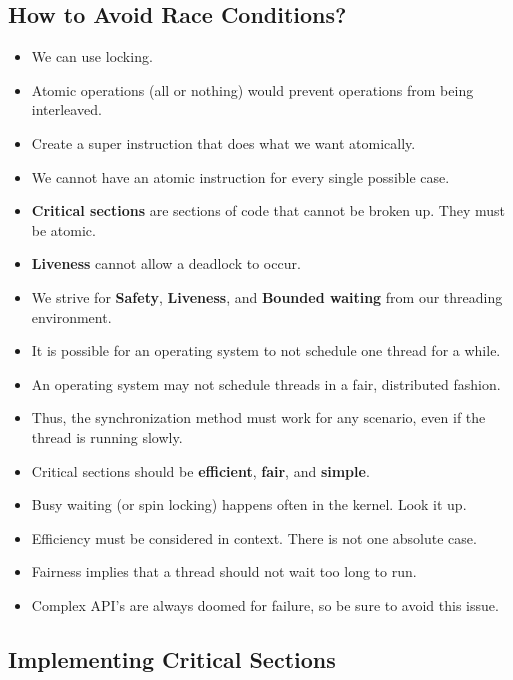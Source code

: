 \documentclass[]{article}
\begin{document}
\subsection{How to Avoid Race Conditions?}
\begin{itemize}
\item We can use locking.
\item Atomic operations (all or nothing) would prevent operations from being
interleaved.
\item Create a super instruction that does what we want atomically.
\item We cannot have an atomic instruction for every single possible case.
\item \textbf{Critical sections} are sections of code that cannot be broken up.
They must be atomic.
\item \textbf{Liveness} cannot allow a deadlock to occur.
\item We strive for \textbf{Safety}, \textbf{Liveness}, and \textbf{Bounded
waiting} from our threading environment.
\item It is possible for an operating system to not schedule one thread for a
while.
\item An operating system may not schedule threads in a fair, distributed
fashion.
\item Thus, the synchronization method must work for any scenario, even if the
thread is running slowly.
\item Critical sections should be \textbf{efficient}, \textbf{fair}, and
\textbf{simple}.
\item Busy waiting (or spin locking) happens often in the kernel. Look it up.
\item Efficiency must be considered in context. There is not one absolute case.
\item Fairness implies that a thread should not wait too long to run.
\item Complex API's are always doomed for failure, so be sure to avoid this
issue.
\end{itemize}

\subsection{Implementing Critical Sections}
\end{document}
